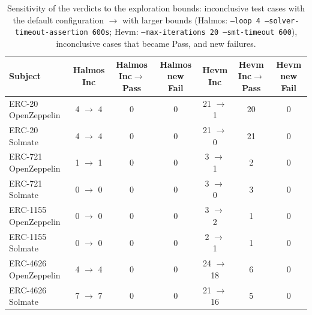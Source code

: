 \begin{table}[htb]
\centering
\begin{scriptsize}
\begin{tabular}{lcccccc}
\toprule
\textbf{Subject} & \textbf{Halmos Inc} & \textbf{Halmos Inc$\rightarrow$Pass} & \textbf{Halmos new Fail} & \textbf{Hevm Inc} & \textbf{Hevm Inc$\rightarrow$Pass} & \textbf{Hevm new Fail} \\
\midrule
ERC-20 OpenZeppelin & 4 $\rightarrow$ 4 & 0 & 0 & 21 $\rightarrow$ 1 & 20 & 0 \\
ERC-20 Solmate & 4 $\rightarrow$ 4 & 0 & 0 & 21 $\rightarrow$ 0 & 21 & 0 \\
ERC-721 OpenZeppelin & 1 $\rightarrow$ 1 & 0 & 0 & 3 $\rightarrow$ 1 & 2 & 0 \\
ERC-721 Solmate & 0 $\rightarrow$ 0 & 0 & 0 & 3 $\rightarrow$ 0 & 3 & 0 \\
ERC-1155 OpenZeppelin & 0 $\rightarrow$ 0 & 0 & 0 & 3 $\rightarrow$ 2 & 1 & 0 \\
ERC-1155 Solmate & 0 $\rightarrow$ 0 & 0 & 0 & 2 $\rightarrow$ 1 & 1 & 0 \\
ERC-4626 OpenZeppelin & 4 $\rightarrow$ 4 & 0 & 0 & 24 $\rightarrow$ 18 & 6 & 0 \\
ERC-4626 Solmate & 7 $\rightarrow$ 7 & 0 & 0 & 21 $\rightarrow$ 16 & 5 & 0 \\
\bottomrule
\end{tabular}
\end{scriptsize}
\caption{Sensitivity of the verdicts to the exploration bounds: inconclusive test cases with the default configuration $\rightarrow$ with larger bounds (Halmos: \texttt{--loop 4 --solver-timeout-assertion 600s}; Hevm: \texttt{--max-iterations 20 --smt-timeout 600}), inconclusive cases that became Pass, and new failures.}
\label{tab:sensitivity}
\end{table}
